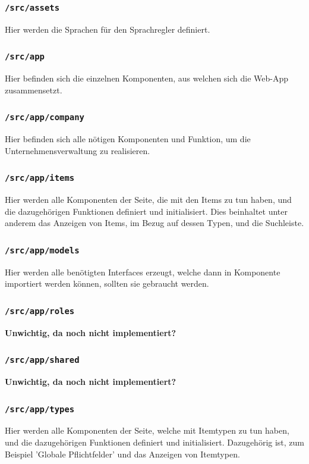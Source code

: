 \documentclass[11pt,a4paper]{report}
\begin{document}
	\subsubsection*{\texttt{/src/assets}}
	Hier werden die Sprachen für den Sprachregler definiert.	
		
	\subsubsection*{\texttt{/src/app}}
	Hier befinden sich die einzelnen Komponenten, aus welchen sich die Web-App zusammensetzt.

	\subsubsection*{\texttt{/src/app/company}}
	Hier befinden sich alle nötigen Komponenten und Funktion, um die Unternehmensverwaltung zu realisieren. 

	\subsubsection*{\texttt{/src/app/items}}
	Hier werden alle Komponenten der Seite, die mit den Items zu tun haben, und die dazugehörigen Funktionen definiert und initialisiert. 
	Dies beinhaltet unter anderem das Anzeigen von Items, im Bezug auf dessen Typen, und die Suchleiste.
	
	\subsubsection*{\texttt{/src/app/models}}
	Hier werden alle benötigten Interfaces erzeugt, welche dann in Komponente importiert werden können, sollten sie gebraucht werden.
	
	\subsubsection*{\texttt{/src/app/roles}}
	\textbf{Unwichtig, da noch nicht implementiert?}
	
	\subsubsection*{\texttt{/src/app/shared}}
	\textbf{Unwichtig, da noch nicht implementiert?}
	
	\subsubsection*{\texttt{/src/app/types}}
	Hier werden alle Komponenten der Seite, welche mit Itemtypen zu tun haben, und die dazugehörigen Funktionen definiert und initialisiert.
	Dazugehörig ist, zum Beispiel 'Globale Pflichtfelder' und das Anzeigen von Itemtypen.
	
\end{document}
